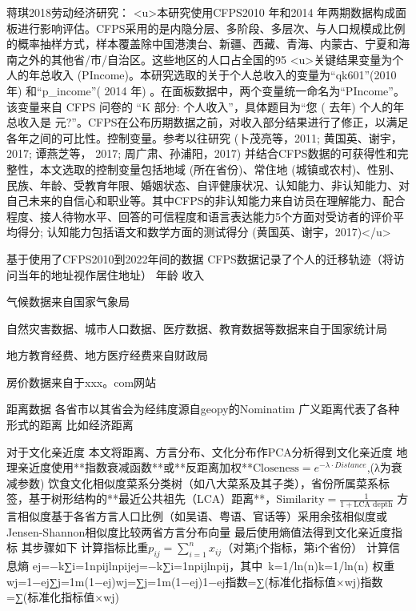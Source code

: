 \documentclass{article}
\numberwithin{equation}{section} %
\begin{document}
蒋琪2018劳动经济研究：
<u>本研究使用CFPS2010 年和2014 年两期数据构成面板进行影响评估。CFPS采用的是内隐分层、多阶段、多层次、与人口规模成比例的概率抽样方式，样本覆盖除中国港澳台、新疆、西藏、青海、内蒙古、宁夏和海南之外的其他省/市/自治区。这些地区的人口占全国的95%
<u>关键结果变量为个人的年总收入 (PIncome)。本研究选取的关于个人总收入的变量为“qk601”(2010 年) 和“p_income”( 2014 年) 。在面板数据中，两个变量统一命名为“PIncome”。该变量来自 CFPS 问卷的 “K 部分: 个人收入”，具体题目为“您 ( 去年) 个人的年总收入是 元?”。CFPS在公布历期数据之前，对收入部分结果进行了修正，以满足各年之间的可比性。控制变量。参考以往研究 (卜茂亮等，2011; 黄国英、谢宇，2017; 谭燕芝等， 2017; 周广肃、孙浦阳，2017) 并结合CFPS数据的可获得性和完整性，本文选取的控制变量包括地域 (所在省份)、常住地 (城镇或农村)、性别、民族、年龄、受教育年限、婚姻状态、自评健康状况、认知能力、非认知能力、对自己未来的自信心和职业等。其中CFPS的非认知能力来自访员在理解能力、配合程度、接人待物水平、回答的可信程度和语言表达能力5个方面对受访者的评价平均得分; 认知能力包括语文和数学方面的测试得分 (黄国英、谢宇，2017)</u>


基于使用了CFPS2010到2022年间的数据
CFPS数据记录了个人的迁移轨迹（将访问当年的地址视作居住地址）
年龄
收入

气候数据来自国家气象局

自然灾害数据、城市人口数据、医疗数据、教育数据等数据来自于国家统计局

地方教育经费、地方医疗经费来自财政局

房价数据来自于xxx。com网站

距离数据
各省市以其省会为经纬度源自geopy的Nominatim
广义距离代表了各种形式的距离 比如经济距离

对于文化亲近度
本文将距离、方言分布、文化分布作PCA分析得到文化亲近度
地理亲近度使用**指数衰减函数**或**反距离加权**$\text{Closeness}=e^ {-\lambda \cdot Distance}$,(λ为衰减参数)
饮食文化相似度菜系分类树（如八大菜系及其子类），省份所属菜系标签，基于树形结构的**最近公共祖先（LCA）距离**，$\text{Similarity}=\frac{1}{1+\text{LCA depth}}$
方言相似度基于各省方言人口比例（如吴语、粤语、官话等）采用余弦相似度或Jensen-Shannon相似度比较两省方言分布向量
最后使用熵值法得到文化亲近度指标
其步骤如下
计算指标比重$p_{ij}​=\sum\limits_{i=1}^{n}​x_{ij}​$​​（对第j个指标，第i个省份）
计算信息熵  ej=−k∑i=1npijln⁡pijej​=−k∑i=1n​pij​lnpij​，其中 k=1/ln⁡(n)k=1/ln(n)
权重wj=1−ej∑j=1m(1−ej)wj​=∑j=1m​(1−ej​)1−ej​​
指数=∑(标准化指标值×wj)指数=∑(标准化指标值×wj​)
\end{document}
